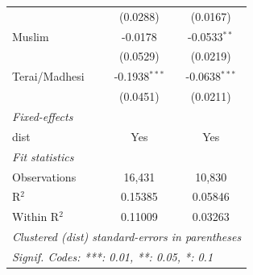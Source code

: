 \begin{tabular}{lcc}
                                     & (0.0288)                & (0.0167)\\   
   Muslim                            & -0.0178                 & -0.0533$^{**}$\\   
                                     & (0.0529)                & (0.0219)\\   
   Terai/Madhesi                     & -0.1938$^{***}$         & -0.0638$^{***}$\\   
                                     & (0.0451)                & (0.0211)\\   
   \midrule
   \emph{Fixed-effects}\\
   dist                              & Yes                     & Yes\\  
   \midrule
   \emph{Fit statistics}\\
   Observations                      & 16,431                  & 10,830\\  
   R$^2$                             & 0.15385                 & 0.05846\\  
   Within R$^2$                      & 0.11009                 & 0.03263\\  
   \midrule \midrule
   \multicolumn{3}{l}{\emph{Clustered (dist) standard-errors in parentheses}}\\
   \multicolumn{3}{l}{\emph{Signif. Codes: ***: 0.01, **: 0.05, *: 0.1}}\\
\end{tabular}
\par\endgroup


